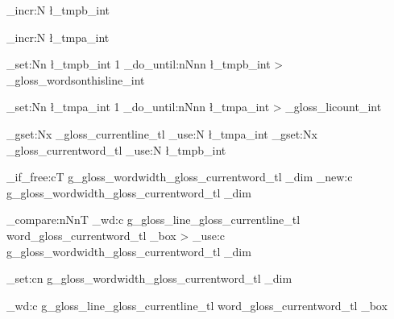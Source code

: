 {{{%

 	 					\int_incr:N 
 	 							\l_tmpb_int
					} 	
		\int_incr:N 
				\l_tmpa_int
		} 	
 	
 	


 	
 	 				\int_set:Nn
					\l_tmpb_int
					{ 1 }
 					\int_do_until:nNnn %
 					{ \l_tmpb_int } > { \g_gloss_wordsonthisline_int } 	%
 					
 					{
					
							
	\int_set:Nn
			\l_tmpa_int
			{ 1 }
 	\int_do_until:nNnn %
 		{ \l_tmpa_int } > { \g_gloss_licount_int } 
 				{
\tl_gset:Nx \g_gloss_currentline_tl { \int_use:N \l_tmpa_int }
\tl_gset:Nx \g_gloss_currentword_tl { \int_use:N \l_tmpb_int }

	\cs_if_free:cT
			{ g_gloss_wordwidth\g_gloss_currentword_tl _dim }
			{ \dim_new:c
					{ g_gloss_wordwidth\g_gloss_currentword_tl _dim }
				}


\dim_compare:nNnT
			{
					\box_wd:c
							{ g_gloss_line\g_gloss_currentline_tl word\g_gloss_currentword_tl _box }
			}
			>
			{ 
					\dim_use:c
							{ g_gloss_wordwidth\g_gloss_currentword_tl _dim }
			}
			{
					\dim_set:cn 
								{ g_gloss_wordwidth\g_gloss_currentword_tl _dim }
								{
								\box_wd:c
											{ g_gloss_line\g_gloss_currentline_tl word\g_gloss_currentword_tl _box }

}}}}}
